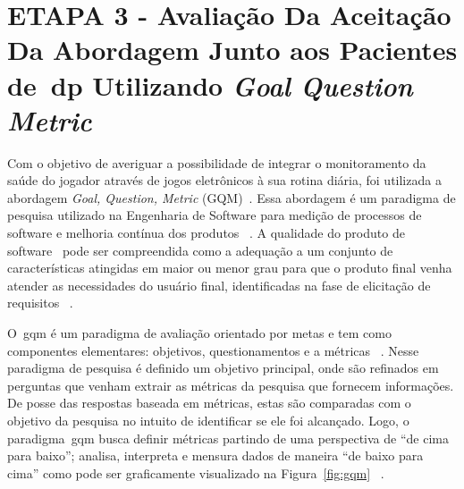 \section{ETAPA 3 - Avaliação Da Aceitação Da Abordagem Junto aos Pacientes de~\ac{dp} Utilizando \textit{Goal Question Metric}}\label{gqm_usuarios}

Com o objetivo de averiguar a possibilidade de integrar o monitoramento da saúde do jogador através de jogos eletrônicos à sua rotina diária, foi utilizada a abordagem \textit{Goal, Question, Metric} (GQM)~\cite{van1999goal}. Essa abordagem é um paradigma de pesquisa utilizado na Engenharia de Software para medição de processos de software e melhoria contínua dos produtos ~\cite{saraiva2006,elicquest05}. A qualidade do produto de software~\cite{saraiva2006} pode ser compreendida como a adequação a um conjunto de características atingidas em maior ou menor grau para que o produto final venha atender as necessidades do usuário final, identificadas na fase de elicitação de requisitos ~\cite{elicquest05}.

O~\ac{gqm} é um paradigma de avaliação orientado por metas e tem como componentes elementares: objetivos, questionamentos e a métricas ~\cite{saraiva2006}. Nesse paradigma de pesquisa é definido um objetivo principal, onde são refinados em perguntas que venham extrair as métricas da pesquisa que fornecem informações. De posse das respostas baseada em métricas, estas são comparadas com o objetivo da pesquisa no intuito de identificar se ele foi alcançado. Logo, o paradigma~\ac{gqm} busca definir métricas partindo de uma perspectiva de ``de cima para baixo''; analisa, interpreta e mensura dados de maneira ``de baixo para cima'' como pode ser graficamente visualizado na Figura~\ref{fig:gqm} ~\cite{van1999goal}. 

